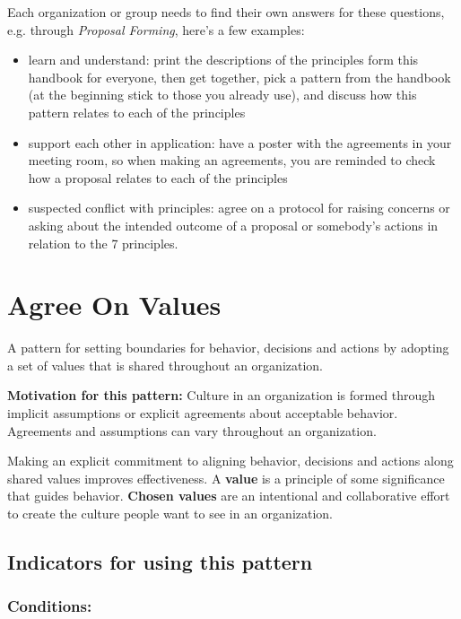 Each organization or group needs to find their own answers for these questions, e.g. through \emph{Proposal Forming}, here's a few examples:

\begin{itemize}
\item learn and understand: print the descriptions of the principles form this handbook for everyone, then get together, pick a pattern from the handbook (at the beginning stick to those you already use), and discuss how this pattern relates to each of the principles

\item support each other in application: have a poster with the agreements in your meeting room, so when making an agreements, you are reminded to check how a proposal relates to each of the principles

\item suspected conflict with principles: agree on a protocol for raising concerns or asking about the intended outcome of a proposal or somebody's actions in relation to the 7 principles.

\end{itemize}

\section{Agree On Values}
\label{agreeonvalues}

A pattern for setting boundaries for behavior, decisions and actions by adopting a set of values that is shared throughout an organization.

\textbf{Motivation for this pattern:} Culture in an organization is formed through implicit assumptions or explicit agreements about acceptable behavior. Agreements and assumptions can vary throughout an organization.

Making an explicit commitment to aligning behavior, decisions and actions along shared values improves effectiveness. A \textbf{value} is a principle of some significance that guides behavior. \textbf{Chosen values} are an intentional and collaborative effort to create the culture people want to see in an organization.

\subsection{Indicators for using this pattern}
\label{indicatorsforusingthispattern}

\subsubsection{Conditions:}
\label{conditions:}

